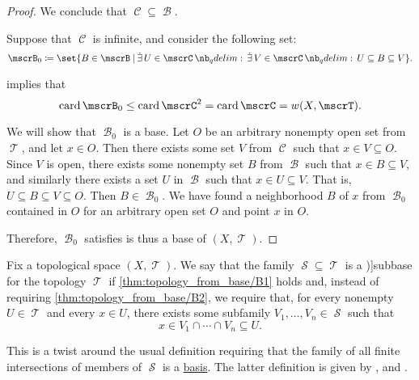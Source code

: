 \begin{proof}
  We conclude that \( \mscrC \subseteq \mscrB \).

   Suppose that \( \mscrC \) is infinite, and consider the following set:
  \begin{equation*}
    \mscrB_0 \coloneqq \set{ B \in \mscrB \given \qexists {U \in \mscrC} \qexists {V \in \mscrC} U \subseteq B \subseteq V }.
  \end{equation*}

   implies that
  \begin{equation*}
    \card\mscrB_0 \leq \card \mscrC^2 = \card \mscrC = w(X, \mscrT).
  \end{equation*}

  We will show that \( \mscrB_0 \) is a base. Let \( O \) be an arbitrary nonempty open set from \( \mscrT \), and let \( x \in O \). Then there exists some set \( V \) from \( \mscrC \) such that \( x \in V \subseteq O \). Since \( V \) is open, there exists some nonempty set \( B \) from \( \mscrB \) such that \( x \in B \subseteq V \), and similarly there exists a set \( U \) in \( \mscrB \) such that \( x \in U \subseteq V \). That is, \( U \subseteq B \subseteq V \subseteq O \). Then \( B \in \mscrB_0 \). We have found a neighborhood \( B \) of \( x \) from \( \mscrB_0 \) contained in \( O \) for an arbitrary open set \( O \) and point \( x \) in \( O \).

  Therefore, \( \mscrB_0 \) satisfies  is thus a base of \( (X, \mscrT) \).
\end{proof}

\begin{definition}\label{def:topological_subbase}\mimprovised
  Fix a topological space \( (X, \mscrT) \). We say that the family \( \mscrS \subseteq \mscrT \) is a \term[ru=предбаза (\cite[def. 4.7]{Александров1977Топология})]{subbase} for the topology \( \mscrT \) if \ref{thm:topology_from_base/B1} holds and, instead of requiring \ref{thm:topology_from_base/B2}, we require that, for every nonempty \( U \in \mscrT \) and every \( x \in U \), there exists some subfamily \( V_1, \ldots, V_n \in \mscrS \) such that
  \begin{equation}\label{eq:def:topological_subbase}
    x \in V_1 \cap \cdots \cap V_n \subseteq U.
  \end{equation}
\end{definition}
\begin{comments}
  \item This is a twist around the usual definition requiring that the family of all finite intersections of members of \( \mscrS \) is a \hyperref[def:topological_base]{basis}. The latter definition is given by ,  and .
\end{comments}

